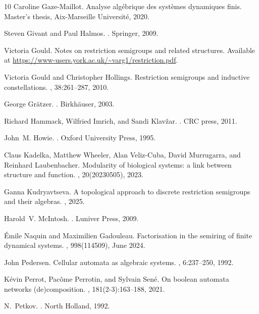 \documentclass[a4paper, 11pt]{article}
\theoremstyle{plain}
\theoremstyle{definition}
\begin{document}
\begin{thebibliography}{10}
Caroline Gaze-Maillot.
\newblock Analyse alg\'ebrique des syst\`emes dynamiques finis.
\newblock Master's thesis, Aix-Marseille Universit\'e, 2020.

Steven Givant and Paul Halmos.
.
\newblock Springer, 2009.

Victoria Gould.
\newblock Notes on restriction semigroups and related structures.
\newblock Available at \url{https://www-users.york.ac.uk/~varg1/restriction.pdf}.

Victoria Gould and Christopher Hollings.
\newblock Restriction semigroups and inductive constellations.
, 38:261--287, 2010.

George Gr\"atzer.
.
\newblock Birkh\"auser, 2003.

Richard Hammack, Wilfried Imrich, and Sandi Klav\v{z}ar.
.
\newblock CRC press, 2011.

John~M. Howie.
.
\newblock Oxford University Press, 1995.

Claus Kadelka, Matthew Wheeler, Alan Veliz-Cuba, David Murrugarra, and Reinhard Laubenbacher.
\newblock Modularity of biological systems: a link between structure and function.
, 20(20230505), 2023.

Ganna Kudryavtseva.
\newblock A topological approach to discrete restriction semigroups and their algebras.
, 2025.

Harold~V. McIntosh.
.
\newblock Luniver Press, 2009.

\'Emile Naquin and Maximilien Gadouleau.
\newblock Factorisation in the semiring of finite dynamical systems.
, 998(114509), June 2024.

John Pedersen.
\newblock Cellular automata as algebraic systems.
, 6:237--250, 1992.

K\'evin Perrot, Pac\^ome Perrotin, and Sylvain Sen\'e.
\newblock On boolean automata networks (de)composition.
, 181(2-3):163--188, 2021.

N.~Petkov.
.
\newblock North Holland, 1992.


\end{thebibliography}
\end{document}
